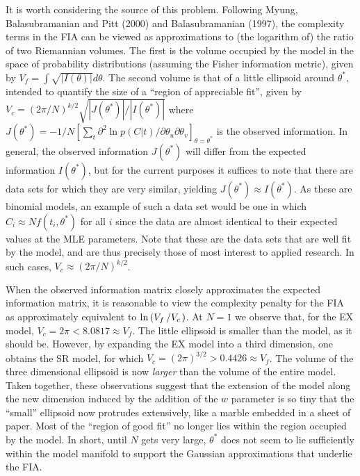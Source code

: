\documentclass[doc,floatsintext]{apa6}
\begin{document}
It is worth considering the source of this problem. Following Myung, Balasubramanian and Pitt (2000) and Balasubramanian (1997), the complexity terms in the FIA can be viewed as approximations to (the logarithm of) the ratio of two Riemannian volumes. The first is the volume occupied by the model in the space of probability distributions (assuming the Fisher information metric), given by $V_f=\int \sqrt{|I(\theta)|} d\theta$. The second volume is that of a little ellipsoid around $\theta^\ast$, intended to quantify the size of a ``region of appreciable fit'', given by $V_c=\left(2\pi/N\right)^{k/2} \sqrt{|J(\theta^\ast)|/|I(\theta^\ast)|}$ where $J(\theta^\ast) = -1/N \left[ \sum_t\partial^2 \ln p(C|t) / \partial \theta_u \partial \theta_v \right]_{\theta = \theta^*}$ is the observed information. In general, the observed information $J(\theta^\ast)$ will differ from the expected information $I(\theta^\ast)$, but for the current purposes it suffices to note that there are data sets for which they are very similar, yielding $J(\theta^\ast) \approx I(\theta^\ast)$. As these are binomial models, an example of such a data set would be one in which $C_i \approx N f(t_i, \theta^*)$ for all $i$ since the data are almost identical to their expected values at the MLE parameters. Note that these are the data sets that are well fit by the model, and are thus precisely those of most interest to applied research. In such cases, $V_c \approx \left(2\pi/N\right)^{k/2}$.

When the observed information matrix closely approximates the expected information matrix, it is reasonable to view the complexity penalty for the FIA as approximately equivalent to $\ln \left(V_f \left/ V_c \right.\right)$. At $N=1$ we observe that, for the EX model, $V_c=2\pi < 8.0817 \approx V_f$. The little ellipsoid is smaller than the model, as it should be. However, by expanding the EX model into a third dimension, one obtains the SR model, for which $V_c=(2\pi)^{3/2} > 0.4426 \approx V_f$. The volume of the three dimensional ellipsoid is now \emph{larger} than the volume of the entire model. Taken together, these observations suggest that the extension of the model along the new dimension induced by the addition of the $w$ parameter is so tiny that the ``small'' ellipsoid now protrudes extensively, like a marble embedded in a sheet of paper. Most of the ``region of good fit'' no longer lies within the region occupied by the model. In short, until $N$ gets very large, $\theta^*$ does not seem to lie sufficiently within the model manifold to support the Gaussian approximations that underlie the FIA.
\end{document}
